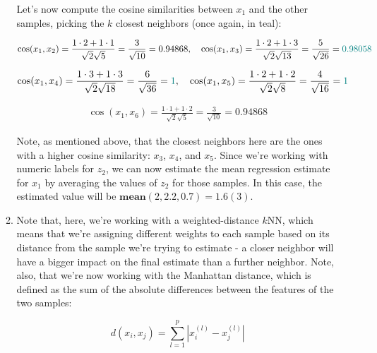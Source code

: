 \documentclass[12pt]{article}
\begin{document}
\begin{enumerate}[leftmargin=\labelsep]
\begin{enumerate}
{                Let's now compute the cosine similarities between $x_1$ and the other
                samples, picking the $k$ closest neighbors (once again, in teal):

                \begin{align*}
                  \cos(x_1, x_2) = \frac{1 \cdot 2 + 1 \cdot 1}{\sqrt{2} \sqrt{5}} = \frac{3}{\sqrt{10}} = 0.94868, \quad
                  \cos(x_1, x_3) = \frac{1 \cdot 2 + 1 \cdot 3}{\sqrt{2} \sqrt{13}} = \frac{5}{\sqrt{26}} = \textcolor{teal}{0.98058}
                \end{align*}

                \begin{align*}
                  \cos(x_1, x_4) = \frac{1 \cdot 3 + 1 \cdot 3}{\sqrt{2} \sqrt{18}} = \frac{6}{\sqrt{36}} = \textcolor{teal}{1}, \quad
                  \cos(x_1, x_5) = \frac{1 \cdot 2 + 1 \cdot 2}{\sqrt{2} \sqrt{8}} = \frac{4}{\sqrt{16}} = \textcolor{teal}{1}
                \end{align*}

                \begin{align*}
                  \cos(x_1, x_6) = \frac{1 \cdot 1 + 1 \cdot 2}{\sqrt{2} \sqrt{5}} = \frac{3}{\sqrt{10}} = 0.94868
                \end{align*}

                Note, as mentioned above, that the closest neighbors here are the ones
                with a higher cosine similarity: $x_3$, $x_4$, and $x_5$. Since we're
                working with numeric labels for $z_2$, we can now estimate the mean
                regression estimate for $x_1$ by averaging the values of $z_2$ for those
                samples. In this case, the estimated value will be $\mathbf{mean} (2, 2.2, 0.7) = 1.6(3)$.
                }
          \item {
                Note that, here, we're working with a weighted-distance $k$NN, which means
                that we're assigning different weights to each sample based on its distance
                from the sample we're trying to estimate - a closer neighbor will have a
                bigger impact on the final estimate than a further neighbor. Note, also,
                that we're now working with the Manhattan distance, which is defined as
                the sum of the absolute differences between the features of the two samples:

                \begin{equation*}
                  d(x_i, x_j) = \sum_{l=1}^p |x_{i}^{(l)} - x_{j}^{(l)}|
                \end{equation*}

}
\end{enumerate}
\end{enumerate}
\end{document}

